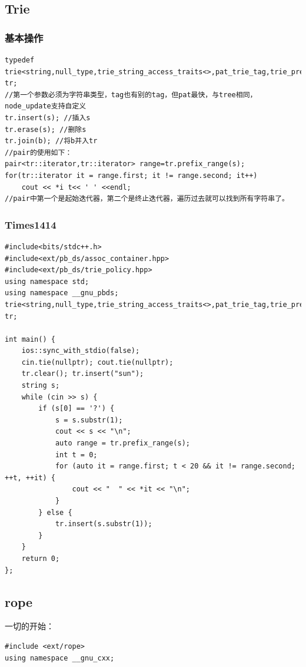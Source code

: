 \subsection{Trie}

\subsubsection{基本操作}
\begin{lstlisting}
typedef trie<string,null_type,trie_string_access_traits<>,pat_trie_tag,trie_prefix_search_node_update> tr;
//第一个参数必须为字符串类型，tag也有别的tag，但pat最快，与tree相同，node_update支持自定义
tr.insert(s); //插入s 
tr.erase(s); //删除s 
tr.join(b); //将b并入tr 
//pair的使用如下：
pair<tr::iterator,tr::iterator> range=tr.prefix_range(s);
for(tr::iterator it = range.first; it != range.second; it++)
    cout << *i t<< ' ' <<endl;
//pair中第一个是起始迭代器，第二个是终止迭代器，遍历过去就可以找到所有字符串了。 
\end{lstlisting}

\subsubsection{Times1414}
\begin{lstlisting}
#include<bits/stdc++.h>
#include<ext/pb_ds/assoc_container.hpp>
#include<ext/pb_ds/trie_policy.hpp>
using namespace std;
using namespace __gnu_pbds; 
trie<string,null_type,trie_string_access_traits<>,pat_trie_tag,trie_prefix_search_node_update> tr;

int main() {
	ios::sync_with_stdio(false);
	cin.tie(nullptr); cout.tie(nullptr);
	tr.clear(); tr.insert("sun");
	string s;
	while (cin >> s) {
		if (s[0] == '?') {
			s = s.substr(1);
			cout << s << "\n";
			auto range = tr.prefix_range(s);
			int t = 0;
			for (auto it = range.first; t < 20 && it != range.second; ++t, ++it) {
				cout << "  " << *it << "\n";
			}
		} else {
			tr.insert(s.substr(1));
		}
	}
	return 0;
};
\end{lstlisting}


\subsection{rope}
一切的开始：
\begin{lstlisting}
#include <ext/rope>
using namespace __gnu_cxx;
\end{lstlisting}

